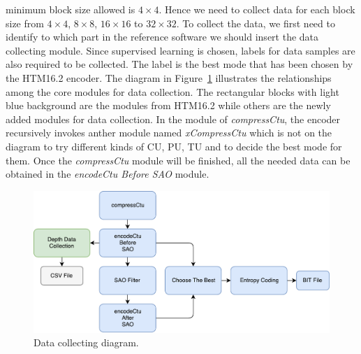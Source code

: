 minimum block size allowed is $4\times4$.
Hence we need to collect data for each block size from $4\times4$,
$8\times8$, $16\times16$ to $32\times32$.
To collect the data, we first need to identify
to which part in the reference software
we should insert the data collecting module.
Since supervised learning is chosen,
labels for data samples are also required to be collected.
The label is the best mode that has been chosen by the HTM16.2 encoder.
The diagram in Figure~\ref{fig:data-collection-diagram} illustrates
the relationships among the core modules for data collection.
The rectangular blocks with light blue background are the modules from
HTM16.2 while others are the newly added modules for data collection.
In the module of \emph{compressCtu}, the encoder recursively invokes
anther module named \emph{xCompressCtu} which is not on the diagram to
try different kinds of CU, PU, TU and to decide the best mode for them.
Once the \emph{compressCtu} module will be finished, all the needed
data can be obtained in the \emph{encodeCtu Before SAO} module.
\begin{figure}
    \centering
    \includegraphics[width=\textwidth,height=\textheight,keepaspectratio]{Figures/thesis-data-collecting-diagram.pdf}
    \caption[Data collecting diagram]{Data collecting diagram.}
    \label{fig:data-collection-diagram}
\end{figure}

